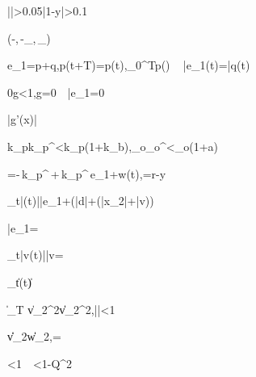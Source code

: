 \left|\right|>0.05\quad {}\quad \left|1-y\right|>0.1

\hat{\delta}\leftarrow{}\left(-,\,-\delta_{\max},\,\delta_{\max}\right)



e_1=p+q,\quad p(t+T)=p(t),\quad \int_0^{T}p(\tau)\,\ \Rightarrow\ \bar{e}_1(t)=\bar{q}(t)

0\le g<1,\quad g=0\ \Leftrightarrow\ \bar{e}_1=0

\left|g'(x)\right|\le{}

k_p\le k_p^{}<k_p\left(1+k_b\right),\quad \omega_o\le\omega_o^{}<\omega_o\left(1+a\right)

\dot{\sigma}=-\,k_p^{}\,\sigma+\,k_p^{}\,e_1+w(t),\quad \sigma=r-y

\limsup_{t\to\infty}\left|\sigma(t)\right|\le\bar{e}_1+\left(\sup\left|d\right|+\left(\sup\left|x_2\right|+\bar{v}\right)\right)

\bar{e}_1=

\limsup_{t\to\infty}\left|v(t)\right|\le\bar{v}=

\limsup_{t\to\infty}\left\|\xi(t)\right\|\le{}

\left\|_T v\right\|_2^2\le{}\left\|v\right\|_2^2,\quad \left|\right|\le\mu<1

\left\|v\right\|_2\le{}\left\|w\right\|_2,\quad \gamma=

\gamma<1\ \Leftrightarrow\ \mu<1-Q^2

